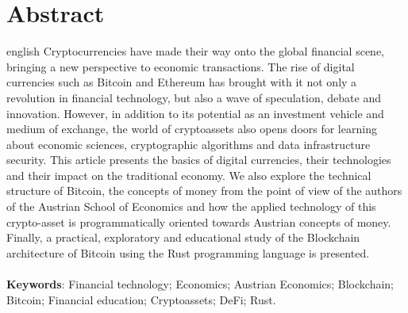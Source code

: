 \documentclass[article,12pt,oneside,a4paper,english,brazil]{unifil}
\begin{document}
\section*{Abstract}
\begin{otherlanguage*}{english}
Cryptocurrencies have made their way onto the global financial scene, bringing a new perspective to economic transactions. The rise of digital currencies such as Bitcoin and Ethereum has brought with it not only a revolution in financial technology, but also a wave of speculation, debate and innovation. However, in addition to its potential as an investment vehicle and medium of exchange, the world of cryptoassets also opens doors for learning about economic sciences, cryptographic algorithms and data infrastructure security. This article presents the basics of digital currencies, their technologies and their impact on the traditional economy. We also explore the technical structure of Bitcoin, the concepts of money from the point of view of the authors of the Austrian School of Economics and how the applied technology of this crypto-asset is programmatically oriented towards Austrian concepts of money. Finally, a practical, exploratory and educational study of the Blockchain architecture of Bitcoin using the Rust programming language is presented.\\
\vspace{\onelineskip}\\
\noindent
\textbf{Keywords}: Financial technology; Economics; Austrian Economics; Blockchain; Bitcoin; Financial education; Cryptoassets; DeFi; Rust.
\end{otherlanguage*}
\end{document}
